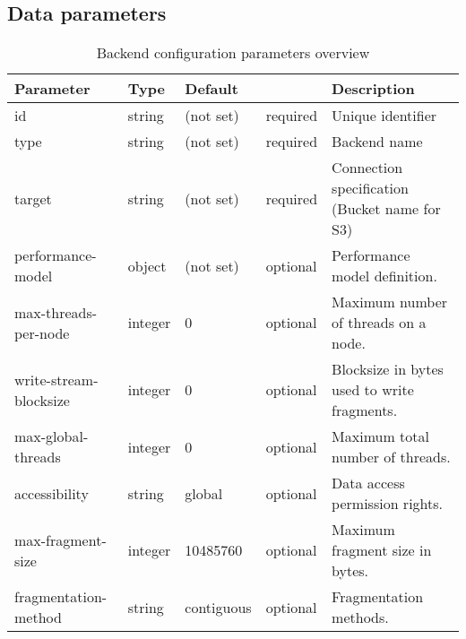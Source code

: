 

\subsection{Data parameters}

\begin{preserve}
\begin{table}[!h]
  \begin{center}
    \begin{scriptsize}
      \begin{tabularx}{\textwidth}{llllX}
        Parameter              & Type    & Default    &          & Description \\
        \hline
        id                     & string  & (not set)  & required & Unique identifier \\
        type                   & string  & (not set)  & required & Backend name \\
        target                 & string  & (not set)  & required & Connection specification (Bucket name for S3) \\
        performance-model      & object  & (not set)  & optional & Performance model definition.\\
        max-threads-per-node   & integer & 0          & optional & Maximum number of threads on a node. \\
        write-stream-blocksize & integer & 0          & optional & Blocksize in bytes used to write fragments. \\
        max-global-threads     & integer & 0          & optional & Maximum total number of threads. \\
        accessibility          & string  & global     & optional & Data access permission rights. \\
        max-fragment-size      & integer & 10485760   & optional & Maximum fragment size in bytes. \\
        fragmentation-method   & string  & contiguous & optional & Fragmentation methods.\\
      \end{tabularx}
    \end{scriptsize}
  \end{center}
  \caption{Backend configuration parameters overview}%
  \label{tab:backend_conf_params}
\end{table}
\end{preserve}

\begin{preserve}
\def\gapsize{1cm}
\end{preserve}
\def\gapsize{1cm}


